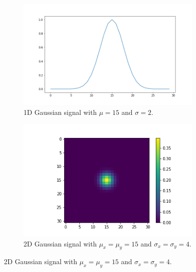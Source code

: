 		\begin{figure}
		    \centering
		    \begin{subfigure}[t]{0.3\textwidth}
		        \includegraphics[width=\textwidth]{graphs/gauss_sigma_4.png}
		        \caption{1D Gaussian signal with $\mu=15$ and $\sigma=2$.}
		    \end{subfigure}%
		    \begin{subfigure}[t]{0.3\textwidth}
		        \includegraphics[width=\textwidth]{images/gauss_sigma_2.png}
		        \caption{2D Gaussian signal with $\mu_x = \mu_y = 15$ and $\sigma_x = \sigma_y = 4$.}
		    \end{subfigure}
		    

\end{figure}
